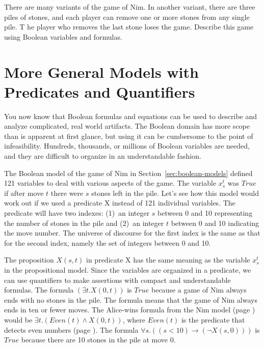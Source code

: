 {\begin{ExerciseList}
\Exercise
There are many variants of the game of Nim.
In another variant, there are three piles of stones, and each player can remove
one or more stones from any single pile. T
he player who removes the last stone loses the game.
Describe this game using Boolean variables and formulas.

\end{ExerciseList}

\section{More General Models with Predicates and Quantifiers}
\label{sec:predicates}

You now know that Boolean formulas and equations can be used
to describe and analyze complicated, real world artifacts.
The Boolean domain has more scope than is apparent at first glance,
but using it can be cumbersome to the point of infeasibility.
Hundreds, thousands, or millions of Boolean variables are needed,
and they are difficult to organize in an understandable fashion.

The Boolean model of the game of Nim in Section~\ref{sec:boolean-models}
defined 121 variables to deal with various aspects of the game.
The variable $x_s^t$
was $True$ if after move $t$ there were $s$ stones left in the pile.
Let's see how this model would work out if we used a predicate X
instead of 121 individual variables.
The predicate will have two indexes: (1)~an integer $s$ between 0 and 10
representing the number of stones in the pile
and (2)~an integer $t$ between 0 and 10 indicating the move number.
The universe of discourse for the first index is the same as that
for the second index, namely the set of integers between 0 and 10.

The proposition $X(s,t)$ in predicate X has the same meaning as the variable
$x_s^t$ in the propositional model.
Since the variables are organized in a predicate,
we can use quantifiers to make assertions with compact and understandable formulas.
The formula  $(\exists t.X(0,t))$
is $True$ because a game of Nim always ends with no
stones in the pile.
The formula means that the game of Nim always ends in ten or fewer moves.
The Alice-wins formula
from the Nim model (page \pageref{alice-wins-formula})
would be $\exists t.(Even(t) \wedge X(0,t))$,
where
$Even(t)$ is the predicate that detects even numbers
(page \pageref{even-number-predicate-Even}).
The formula $\forall s.((s < 10) \rightarrow (\neg X(s,0)))$
is $True$ because there are 10 stones in the pile at move 0.

}
